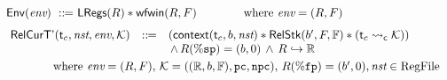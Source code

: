 \begin{figure}[!t]
\[\begin{array}{l}
\begin{array}{lll}
            \end{array}
            \\
            \\
            \Env{\env} \ \define \ 
                \LRegs{\RFile} \sepstar 
                \wfwin{\RFile}{\Wstack} \qquad \qquad 
                \text{where} \ \env = (\RFile, \Wstack)
                \\
            \\[-5pt]
            \hspace*{-0.15em}
            \begin{array}{lll}
                \RelCurTAux{\thrdid_c}{\nst}{\env}{\hthrdlocalst} & \define &
                (\relcontext{\thrdid_c}{\block}{\nst} \sepstar 
                \RelStk{\block'}{\Wstack}{\hWstk} \sepstar (\astCurCont{\thrdid_c}{\hthrdlocalst})) \\
                & & \, \land \,  \RFile(\spreg) = (\block, 0) \, \land \, 
                \Rinj{\RFile}{\hRfile}
            \end{array}
            \\
            \\[-9pt]
            \qquad\qquad
            \text{where} \ \env = (\RFile, \Wstack), \, 
            \hthrdlocalst = ((\hRfile, \block, \hWstk), \pc, \npc), 
            \, \RFile(\fpreg) = (\block', 0), \nst \in \text{RegFile} \\

\end{array}\]
\end{figure}
